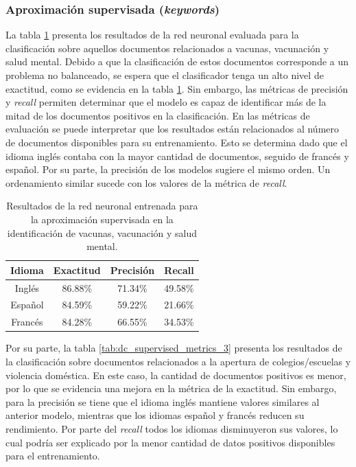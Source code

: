 \subsubsection{Aproximación supervisada (\textit{keywords})}
La tabla \ref{tab:dc_supervised_metrics_2} presenta los resultados de la red neuronal evaluada para la clasificación sobre aquellos documentos relacionados a vacunas, vacunación y salud mental. Debido a que la clasificación de estos documentos corresponde a un problema no balanceado, se espera que el clasificador tenga un alto nivel de exactitud, como se evidencia en la tabla \ref{tab:dc_supervised_metrics_2}. Sin embargo, las métricas de precisión y \textit{recall} permiten determinar que el modelo es capaz de identificar más de la mitad de los documentos positivos en la clasificación. En las métricas de evaluación se puede interpretar que los resultados están relacionados al número de documentos disponibles para su entrenamiento. Esto se determina dado que el idioma inglés contaba con la mayor cantidad de documentos, seguido de francés y español. Por su parte, la precisión de los modelos sugiere el mismo orden. Un ordenamiento similar sucede con los valores de la métrica de \textit{recall}. 

\begin{table}[H]
    \centering
    \begin{tabular}{|c|c|c|c|}
        \textbf{Idioma} & \textbf{Exactitud} & \textbf{Precisión} & \textbf{Recall} \\ \hline
        Inglés & 86.88\% & 71.34\% & 49.58\% \\
        Español & 84.59\% & 59.22\% & 21.66\%  \\
        Francés & 84.28\% & 66.55\% & 34.53\% \\
    \end{tabular}
    \caption{Resultados de la red neuronal entrenada para la aproximación supervisada en la identificación de vacunas, vacunación y salud mental.}
    \label{tab:dc_supervised_metrics_2}
\end{table}

Por su parte, la tabla \ref{tab:dc_supervised_metrics_3} presenta los resultados de la clasificación sobre documentos relacionados a la apertura de colegios/escuelas y violencia doméstica. En este caso, la cantidad de documentos positivos es menor, por lo que se evidencia una mejora en la métrica de la exactitud. Sin embargo, para la precisión se tiene que el idioma inglés mantiene valores similares al anterior modelo, mientras que los idiomas español y francés reducen su rendimiento. Por parte del \textit{recall} todos los idiomas disminuyeron sus valores, lo cual podría ser explicado por la menor cantidad de datos positivos disponibles para el entrenamiento.

